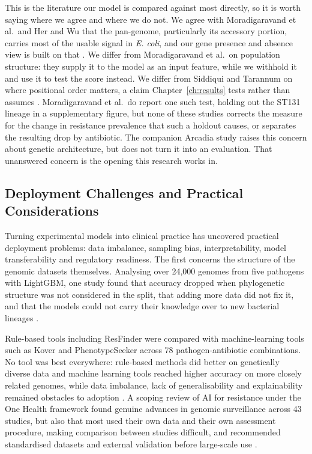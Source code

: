 \vspace{1em}

This is the literature our model is compared against most directly, so it is worth saying where we agree and where we do not. We agree with Moradigaravand et al.\ and Her and Wu that the pan-genome, particularly its accessory portion, carries most of the usable signal in \textit{E. coli}, and our gene presence and absence view is built on that \cite{moradigaravand2018, her2018pangenome}. We differ from Moradigaravand et al.\ on population structure: they supply it to the model as an input feature, while we withhold it and use it to test the score instead. We differ from Siddiqui and Tarannum on where positional order matters, a claim Chapter~\ref{ch:results} tests rather than assumes \cite{siddiqui2025amrensemble}. Moradigaravand et al.\ do report one such test, holding out the ST131 lineage in a supplementary figure, but none of these studies corrects the measure for the change in resistance prevalence that such a holdout causes, or separates the resulting drop by antibiotic. The companion Arcadia study raises this concern about genetic architecture, but does not turn it into an evaluation. That unanswered concern is the opening this research works in.

\subsection{Deployment Challenges and Practical Considerations}

Turning experimental models into clinical practice has uncovered practical deployment problems: data imbalance, sampling bias, interpretability, model transferability and regulatory readiness. The first concerns the structure of the genomic datasets themselves. Analysing over 24,000 genomes from five pathogens with LightGBM, one study found that accuracy dropped when phylogenetic structure was not considered in the split, that adding more data did not fix it, and that the models could not carry their knowledge over to new bacterial lineages \cite{Yu2025}.

\vspace{1em}

Rule-based tools including ResFinder were compared with machine-learning tools such as Kover and PhenotypeSeeker across 78 pathogen-antibiotic combinations. No tool was best everywhere: rule-based methods did better on genetically diverse data and machine learning tools reached higher accuracy on more closely related genomes, while data imbalance, lack of generalisability and explainability remained obstacles to adoption \cite{Hu2024}. A scoping review of AI for resistance under the One Health framework found genuine advances in genomic surveillance across 43 studies, but also that most used their own data and their own assessment procedure, making comparison between studies difficult, and recommended standardised datasets and external validation before large-scale use \cite{kasse2025onehealth}.

